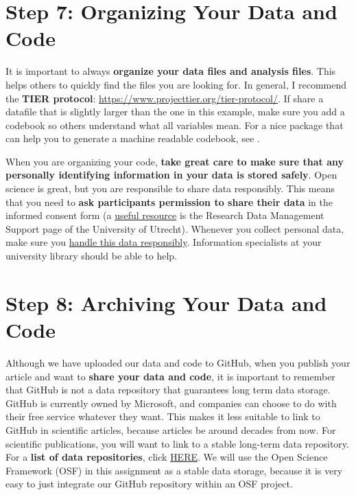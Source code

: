 \documentclass[
  oneside]{book}
\begin{document}
\hypertarget{step-7-organizing-your-data-and-code}{%
\section{Step 7: Organizing Your Data and Code}\label{step-7-organizing-your-data-and-code}}

It is important to always \textbf{organize your data files and analysis files}. This
helps others to quickly find the files you are looking for. In general, I
recommend the \textbf{TIER protocol}: \url{https://www.projecttier.org/tier-protocol/}.
If share a datafile that is slightly larger than the one in this example, make
sure you add a codebook so others understand what all variables mean. For a nice package that can help you to generate a machine readable codebook, see \citet{arslan_how_2019}.

When you are organizing your code, \textbf{take great care to make sure that any personally identifying information in your data is stored safely}. Open science is great, but you are responsible to share data responsibly. This means that you need to \textbf{ask participants permission to share their data} in the informed consent form (a \href{https://www.uu.nl/en/research/research-data-management/guides/informed-consent-for-data-sharing}{useful resource}
is the Research Data Management Support page of the University of Utrecht).
Whenever you collect personal data, make sure you \href{https://www.uu.nl/en/research/research-data-management/guides/handling-personal-data}{handle this data responsibly}. Information specialists at your university library should be able to help.

\hypertarget{step-8-archiving-your-data-and-code}{%
\section{Step 8: Archiving Your Data and Code}\label{step-8-archiving-your-data-and-code}}

Although we have uploaded our data and code to GitHub, when you publish your article and want to \textbf{share your data and code}, it is important to remember that GitHub is not a data repository that guarantees long term data storage.
GitHub is currently owned by Microsoft, and companies can choose to do with their free service whatever they want. This makes it less suitable to link to GitHub in scientific articles, because articles be around decades from now. For scientific publications, you will want to link to a stable long-term data repository. For a \textbf{list of data repositories}, click \href{http://journals.plos.org/plosone/s/data-availability\#loc-recommended-repositories}{HERE}.
We will use the Open Science Framework (OSF) in this assignment as a stable data storage, because it is very easy to just integrate our GitHub repository within an OSF project.
\end{document}

